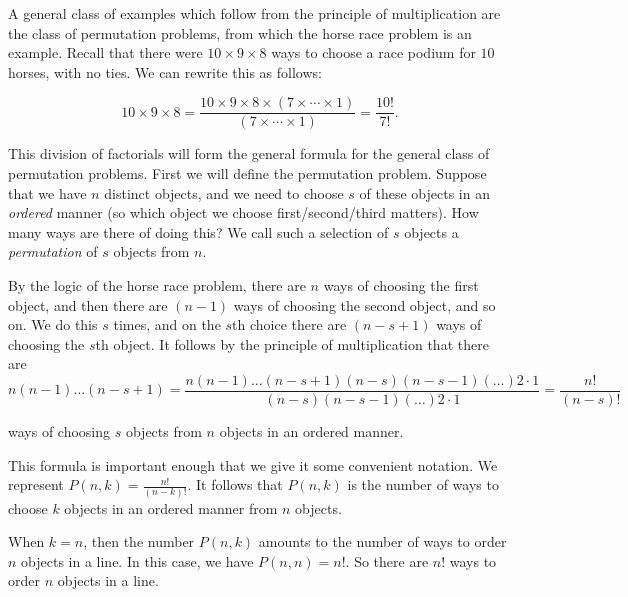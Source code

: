 A general class of examples which follow from the principle of multiplication are the class of permutation problems, from which the horse race problem is an example. Recall that there were $10 \times 9 \times 8$ ways to choose a race podium for $10$ horses, with no ties. We can rewrite this as follows:

\[10 \times 9 \times 8 = \frac{10 \times 9 \times 8 \times (7 \times \cdots \times 1)}{(7 \times \cdots \times 1)} = \frac{10!}{7!}.\]

This division of factorials will form the general formula for the general class of permutation problems. First we will define the permutation problem. Suppose that we have $n$ distinct objects, and we need to choose $s$ of these objects in an \textit{ordered} manner (so which object we choose first/second/third matters). How many ways are there of doing this? We call such a selection of $s$ objects a \textit{permutation} of $s$ objects from $n$.

By the logic of the horse race problem, there are $n$ ways of choosing the first object, and then there are $(n-1)$ ways of choosing the second object, and so on. We do this $s$ times, and on the $s$th choice there are $(n-s + 1)$ ways of choosing the $s$th object. It follows by the principle of multiplication that there are
\[n(n-1)\dots(n-s+1) = \frac{n(n-1)\dots(n-s+1)(n-s)(n-s-1)(\dots)2\cdot1}{(n-s)(n-s-1)(\dots)2\cdot1} = \frac{n!}{(n-s)!}\]

ways of choosing $s$ objects from $n$ objects in an ordered manner.

This formula is important enough that we give it some convenient notation. We represent $P(n, k) = \frac{n!}{(n-k)!}$. It follows that $P(n, k)$ is the number of ways to choose $k$ objects in an ordered manner from $n$ objects.

When $k = n$, then the number $P(n, k)$ amounts to the number of ways to order $n$ objects in a line. In this case, we have $P(n, n) = n!$. So there are $n!$ ways to order $n$ objects in a line.


